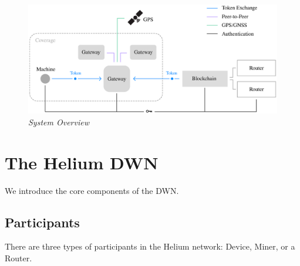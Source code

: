 \documentclass[10pt, nonatbib, nocopyrightspace, reprint]{sigplanconf}
\begin{document}
\begin{figure}[ht]
    \begin{center}
          \includegraphics[width=\textwidth]{schematic.eps}
          \caption{\emph{System Overview}}\label{fig:system}
     \end{center}
\end{figure}


\section{The Helium DWN}

We introduce the core components of the DWN.

\subsection{Participants}

There are three types of participants in the Helium network: Device, Miner, or a Router.
\end{document}
